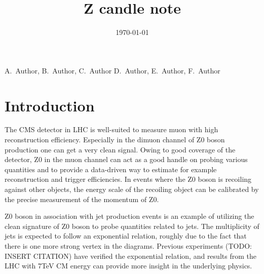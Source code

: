 \documentclass{cmspaper}
\begin{document}
\begin{titlepage}

   \date{\today}

   \title{Z candle note}

   \begin{Authlist}
    A.~Author, B.~Author, C.~Author
    D.~Author, E.~Author, F.~Author
   \end{Authlist}


  \begin{abstract}
  \end{abstract}

\end{titlepage}

\setcounter{page}{2}

\section{Introduction}


The CMS detector in LHC is well-suited to measure muon with high reconstruction efficiency.
Especially in the dimuon channel of Z0 boson production one can get a very clean signal.
Owing to good coverage of the detector, Z0 in the muon channel can act as a good handle on probing various quantities and to provide a data-driven way to estimate
for example reconstruction and trigger efficiencies.
In events where the Z0 boson is recoiling against other objects, the energy scale of the recoiling object can be calibrated by the precise measurement of the momentum of Z0.

Z0 boson in association with jet production events is an example of utilizing the clean signature of Z0 boson to probe quantities related to jets.
The multiplicity of jets is expected to follow an exponential relation, roughly due to the fact that there is one more strong vertex in the diagrams.
Previous experiments (TODO: INSERT CITATION) have verified the exponential relation,
and results from the LHC with 7TeV CM energy can provide more insight in the underlying physics.
\end{document}
